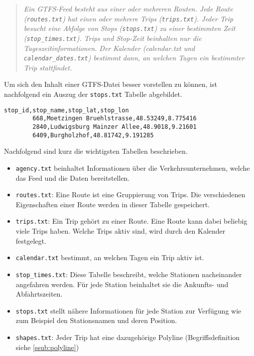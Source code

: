       \begin{quote}
        \textit{Ein GTFS-Feed besteht aus einer oder mehreren Routen. Jede Route (\texttt{routes.txt}) hat einen oder mehrere Trips (\texttt{trips.txt}). Jeder Trip besucht eine Abfolge von Stops (\texttt{stops.txt}) zu einer bestimmten Zeit (\texttt{stop\_times.txt}). Trips und Stop-Zeit beinhalten nur die Tageszeitinformationen. Der Kalender (calendar.txt und \texttt{calendar\_dates.txt}) bestimmt dann, an welchen Tagen ein bestimmter Trip stattfindet.} \cite[S. 8]{zervaas}
      \end{quote}

      Um sich den Inhalt einer GTFS-Datei besser vorstellen zu können, ist nachfolgend ein Auszug der \texttt{stops.txt} Tabelle abgebildet.

      \begin{lstlisting}[captionpos=b, caption=Auszug der ersten Zeilen von \texttt{stops.txt}, label=lst:gtfs-auszug]
        stop_id,stop_name,stop_lat,stop_lon
        668,Moetzingen Bruehlstrasse,48.53249,8.775416
        2840,Ludwigsburg Mainzer Allee,48.9018,9.21601
        6409,Burgholzhof,48.81742,9.191285
      \end{lstlisting}

      Nachfolgend sind kurz die wichtigsten Tabellen beschrieben.

      \begin{itemize}
        \item \texttt{agency.txt} beinhaltet Informationen über die Verkehrsunternehmen, welche das Feed und die Daten bereitstellen.

        \item \texttt{routes.txt}: Eine Route ist eine Gruppierung von Trips. Die verschiedenen Eigenschaften einer Route werden in dieser Tabelle gespeichert.

        \item \texttt{trips.txt}: Ein Trip gehört zu einer Route. Eine Route kann dabei beliebig viele Trips haben. Welche Trips aktiv sind, wird durch den Kalender festgelegt.

        \item \texttt{calendar.txt} bestimmt, an welchen Tagen ein Trip aktiv ist.

        \item \texttt{stop\_times.txt}: Diese Tabelle beschreibt, welche Stationen nacheinander angefahren werden. Für jede Station beinhaltet sie die Ankunfts- und Abfahrtszeiten.

        \item \texttt{stops.txt} stellt nähere Informationen für jede Station zur Verfügung wie zum Beispiel den Stationsnamen und deren Position.

        \item \texttt{shapes.txt}: Jeder Trip hat eine dazugehörige Polyline (Begriffsdefinition siehe \ref{ssub:polyline})

      \end{itemize}

